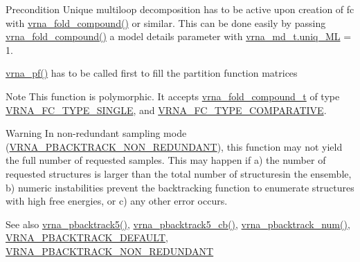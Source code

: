 \begin{DoxyPrecond}{Precondition}
Unique multiloop decomposition has to be active upon creation of {\ttfamily fc} with \mbox{\hyperlink{group__fold__compound_ga6601d994ba32b11511b36f68b08403be}{vrna\+\_\+fold\+\_\+compound()}} or similar. This can be done easily by passing \mbox{\hyperlink{group__fold__compound_ga6601d994ba32b11511b36f68b08403be}{vrna\+\_\+fold\+\_\+compound()}} a model details parameter with \mbox{\hyperlink{group__model__details_ade065b814a4e2e72ead93ab502613ed2}{vrna\+\_\+md\+\_\+t.\+uniq\+\_\+\+ML}} = 1. 

\mbox{\hyperlink{group__part__func__global_ga29e256d688ad221b78d37f427e0e99bc}{vrna\+\_\+pf()}} has to be called first to fill the partition function matrices
\end{DoxyPrecond}
\begin{DoxyNote}{Note}
This function is polymorphic. It accepts \mbox{\hyperlink{group__fold__compound_ga1b0cef17fd40466cef5968eaeeff6166}{vrna\+\_\+fold\+\_\+compound\+\_\+t}} of type \mbox{\hyperlink{group__fold__compound_gga01a4ff86fa71deaaa5d1abbd95a1447da7e264dd3cf2dc9b6448caabcb7763cd6}{V\+R\+N\+A\+\_\+\+F\+C\+\_\+\+T\+Y\+P\+E\+\_\+\+S\+I\+N\+G\+LE}}, and \mbox{\hyperlink{group__fold__compound_gga01a4ff86fa71deaaa5d1abbd95a1447dab821ce46ea3cf665be97df22a76f5023}{V\+R\+N\+A\+\_\+\+F\+C\+\_\+\+T\+Y\+P\+E\+\_\+\+C\+O\+M\+P\+A\+R\+A\+T\+I\+VE}}.
\end{DoxyNote}
\begin{DoxyWarning}{Warning}
In non-\/redundant sampling mode (\mbox{\hyperlink{group__subopt__stochbt_ga9d580ce645aa0c38b69afdf56c332200}{V\+R\+N\+A\+\_\+\+P\+B\+A\+C\+K\+T\+R\+A\+C\+K\+\_\+\+N\+O\+N\+\_\+\+R\+E\+D\+U\+N\+D\+A\+NT}}), this function may not yield the full number of requested samples. This may happen if a) the number of requested structures is larger than the total number of structuresin the ensemble, b) numeric instabilities prevent the backtracking function to enumerate structures with high free energies, or c) any other error occurs.
\end{DoxyWarning}
\begin{DoxySeeAlso}{See also}
\mbox{\hyperlink{group__subopt__stochbt_ga72ebbe45bcbce147a12f27f62b38db78}{vrna\+\_\+pbacktrack5()}}, \mbox{\hyperlink{group__subopt__stochbt_ga626beb5b5b962d7e7c8433cd2cfd4e93}{vrna\+\_\+pbacktrack5\+\_\+cb()}}, \mbox{\hyperlink{group__subopt__stochbt_ga596ed9bcd86f629a7c7c59c58b297db5}{vrna\+\_\+pbacktrack\+\_\+num()}}, \mbox{\hyperlink{group__subopt__stochbt_ga760aa2fb2d5e3d7521a11454a21e9b9f}{V\+R\+N\+A\+\_\+\+P\+B\+A\+C\+K\+T\+R\+A\+C\+K\+\_\+\+D\+E\+F\+A\+U\+LT}}, \mbox{\hyperlink{group__subopt__stochbt_ga9d580ce645aa0c38b69afdf56c332200}{V\+R\+N\+A\+\_\+\+P\+B\+A\+C\+K\+T\+R\+A\+C\+K\+\_\+\+N\+O\+N\+\_\+\+R\+E\+D\+U\+N\+D\+A\+NT}}
\end{DoxySeeAlso}

